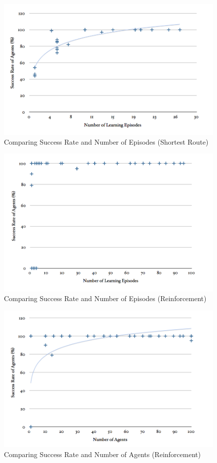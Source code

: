 \documentclass[a4paper,oneside]{report}
\begin{document}
\begin{figure}[H]
  \centering
    \includegraphics[width=140mm]{sources/images/SE_SR}
    \caption{Comparing Success Rate and Number of Episodes (Shortest Route)}
    \label{fig:SE_SR}
\end{figure}

\begin{figure}[H]
  \centering
    \includegraphics[width=140mm]{sources/images/SE_RL}
    \caption{Comparing Success Rate and Number of Episodes (Reinforcement)}
    \label{fig:SE_RL}
\end{figure}

\begin{figure}[H]
  \centering
    \includegraphics[width=140mm]{sources/images/SA_RL}
    \caption{Comparing Success Rate and Number of Agents (Reinforcement)}
    \label{fig:SA_RL}
\end{figure}
\end{document}
